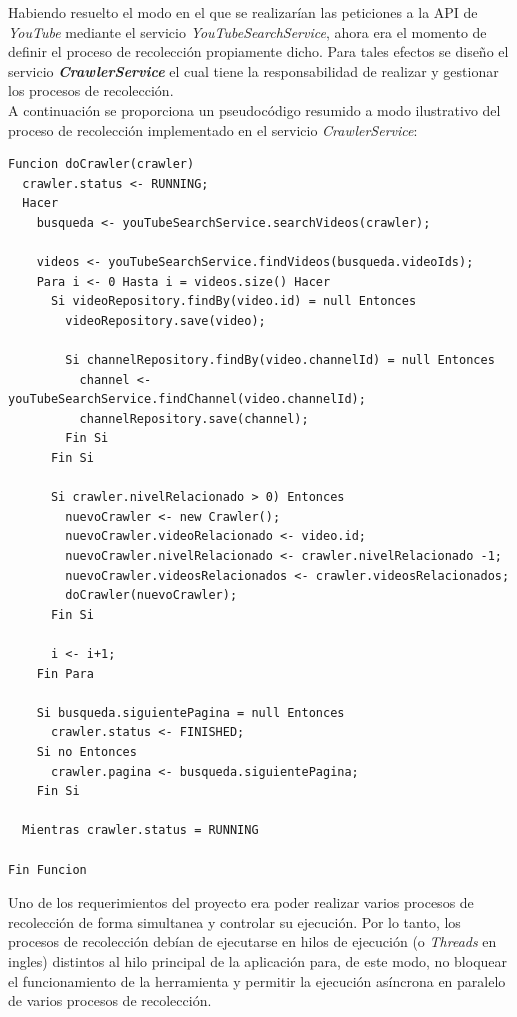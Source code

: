\documentclass[11pt,a4paper]{article}
\begin{document}
Habiendo resuelto el modo en el que se realizarían las peticiones a la API de \textit{YouTube} mediante el servicio \textit{YouTubeSearchService}, ahora era el momento de definir el proceso de recolección propiamente dicho. Para tales efectos se diseño el servicio \textit{\textbf{CrawlerService}} el cual tiene la responsabilidad de realizar y gestionar los procesos de recolección.
\\

A continuación se proporciona un pseudocódigo resumido a modo ilustrativo del proceso de recolección implementado en el servicio \textit{CrawlerService}:
\begin{lstlisting}[style=C]
Funcion doCrawler(crawler)
  crawler.status <- RUNNING;
  Hacer
    busqueda <- youTubeSearchService.searchVideos(crawler);
    
    videos <- youTubeSearchService.findVideos(busqueda.videoIds);
    Para i <- 0 Hasta i = videos.size() Hacer
      Si videoRepository.findBy(video.id) = null Entonces
        videoRepository.save(video);
        
        Si channelRepository.findBy(video.channelId) = null Entonces
          channel <- youTubeSearchService.findChannel(video.channelId);
          channelRepository.save(channel);
        Fin Si
      Fin Si
      
      Si crawler.nivelRelacionado > 0) Entonces
        nuevoCrawler <- new Crawler();
        nuevoCrawler.videoRelacionado <- video.id;
        nuevoCrawler.nivelRelacionado <- crawler.nivelRelacionado -1;
        nuevoCrawler.videosRelacionados <- crawler.videosRelacionados;
        doCrawler(nuevoCrawler);
      Fin Si
      
      i <- i+1;
    Fin Para
    
    Si busqueda.siguientePagina = null Entonces
      crawler.status <- FINISHED;
    Si no Entonces
      crawler.pagina <- busqueda.siguientePagina;
    Fin Si
    
  Mientras crawler.status = RUNNING
  
Fin Funcion
\end{lstlisting}	


Uno de los requerimientos del proyecto era poder realizar varios procesos de recolección de forma simultanea y controlar su ejecución. Por lo tanto, los procesos de recolección debían de ejecutarse en hilos de ejecución (o \textit{Threads} en ingles) distintos al hilo principal de la aplicación para, de este modo, no bloquear el funcionamiento de la herramienta y permitir la ejecución asíncrona en paralelo de varios procesos de recolección.
\\
\end{document}
